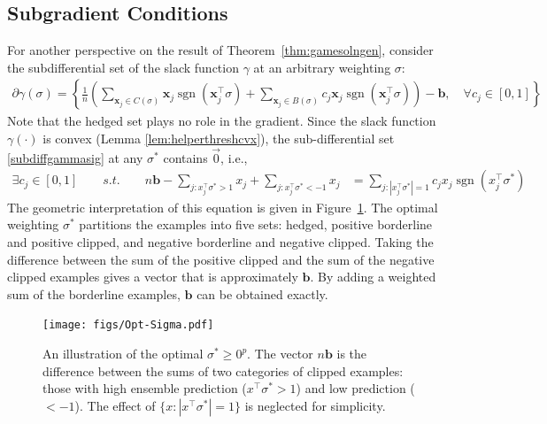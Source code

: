 \documentclass{colt2015} %
\newcommand{\vx}{\mathbf{x}}
\newcommand{\vb}{\mathbf{b}}
\DeclareMathOperator{\sgn}{sgn}
\newcommand{\abs}[1]{\left| #1 \right|}
\newcommand{\lrp}[1]{\left(#1\right)}
\newcommand{\authcmt}[2]{\textcolor{#1}{}}
\newcommand{\yoav}[1]{\authcmt{blue}{[YF: #1]}}
\begin{document}
\subsection{Subgradient Conditions}
For another perspective on the result of Theorem~\ref{thm:gamesolngen}, 
consider the subdifferential set of the slack function $\gamma$ at an arbitrary weighting $\sigma$:
\begin{align}
\label{subdiffgammasig}
\partial \gamma (\sigma) 
= \left\{ \frac{1}{n} \lrp{ \sum_{\vx_j \in C(\sigma)} \vx_j \sgn(\vx_j^\top \sigma) 
+ \sum_{\vx_j \in B(\sigma)} c_j \vx_j \sgn(\vx_j^\top \sigma) } - \vb
, \quad \forall c_j \in [0,1]  \right\}
\end{align}
Note that the hedged set plays no role in the gradient.
Since the slack function $\gamma(\cdot)$ is convex (Lemma \ref{lem:helperthreshcvx}), 
the sub-differential set \eqref{subdiffgammasig} at any $\sigma^*$ contains $\vec{0}$, 
i.e.,
\begin{align}
\label{gammasgexact}
\exists c_j \in [0,1] \qquad s.t. \qquad 
n \vb - \sum_{j : x_{j}^\top \sigma^* > 1} x_{j} + \sum_{j : x_{j}^\top \sigma^* < -1} x_{j} 
&= \sum_{j : \abs{x_{j}^\top \sigma^*} = 1} c_j x_{j} \sgn(x_{j}^\top \sigma^*)
\end{align}
The geometric interpretation of this equation is given in Figure~\ref{fig:optsigma}. 
The optimal weighting $\sigma^*$ partitions the examples into five sets: 
hedged, positive borderline and positive clipped, and negative borderline and negative clipped. 
Taking the difference between the sum of the positive clipped and the sum of the negative
clipped examples gives a vector that is approximately $\vb$. 
By adding a weighted sum of the borderline examples, $\vb$ can be obtained exactly.

\begin{figure}
\label{fig:optsigma}
\centering
\texttt{[image: figs/Opt-Sigma.pdf]}
\caption{\small An illustration of the optimal $\sigma^* \geq 0^p$. 
The vector $n \vb$ is the difference between the sums of two categories of clipped examples: 
those with high ensemble prediction ($x^\top \sigma^* > 1$) and low prediction ($< -1$).
The effect of $\{ x : \abs{x^\top \sigma^*} = 1\}$ is neglected for simplicity. 
}
\end{figure}

\iffalse 
\yoav{I don't think this duality, while true,  gives much insight}
\end{document}

